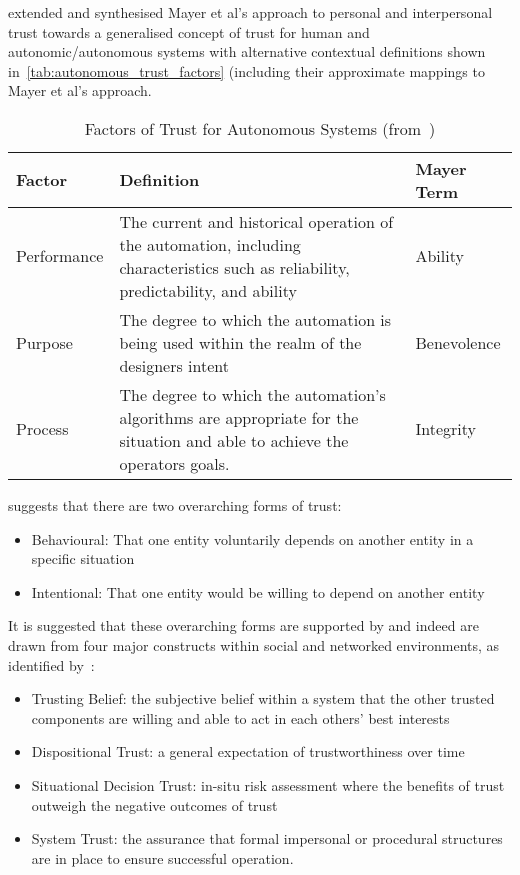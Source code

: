 
\citet{Lee2004} extended and synthesised Mayer et al's approach to personal and interpersonal trust towards a generalised concept of trust for human and autonomic/autonomous systems with alternative contextual definitions shown in~\autoref{tab:autonomous_trust_factors} (including their approximate mappings to Mayer et al's approach.

\begin{table}
  \caption[Factors of Trust for Autonomous Systems]{Factors of Trust for Autonomous Systems (from~\citet{Lee2004})}
  \label{tab:autonomous_trust_factors}
  \begin{tabularx}{\textwidth}{p{2cm}X p{2cm}}\toprule
    Factor & Definition & Mayer Term\\ \midrule
    Performance & The current and historical operation of the automation, including characteristics such as reliability, predictability, and ability & Ability\\
    Purpose & The degree to which the automation is being used within the realm of the designers intent & Benevolence \\
    Process & The degree to which the automation's algorithms are appropriate for the situation and able to achieve the operators goals.
    & Integrity\\

    \bottomrule
  \end{tabularx}
\end{table}

\citet{Sun2008} suggests that there are two overarching forms of trust:
\begin{itemize}
  \item Behavioural: That one entity voluntarily depends on another entity in a specific situation
  \item Intentional: That one entity would be willing to depend on another entity
\end{itemize}

It is suggested that these overarching forms are supported by and indeed are drawn from four major constructs within social and networked environments, as identified by~\citet{Mcknight1996}:

\begin{itemize}
  \item Trusting Belief: the subjective belief within a system that the other trusted components are willing and able to act in each others' best interests
  \item Dispositional Trust: a general expectation of trustworthiness over time 
  \item Situational Decision Trust: in-situ risk assessment where the benefits of trust outweigh the negative outcomes of trust
  \item System Trust: the assurance that formal impersonal or procedural structures are in place to ensure successful operation.
\end{itemize}

